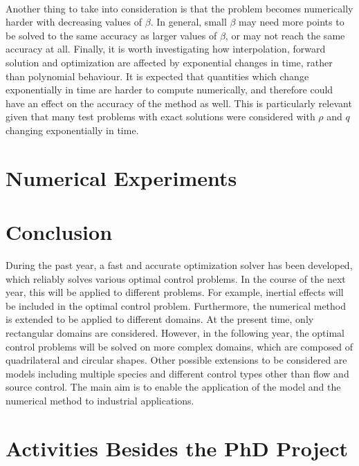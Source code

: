 \documentclass[11pt, a4paper]{article}
\theoremstyle{definition}
\newcommand{\adj}{q}
\begin{document}
\\
Another thing to take into consideration is that the problem becomes numerically harder with decreasing values of $\beta$. In general, small $\beta$ may need more points to be solved to the same accuracy as larger values of $\beta$, or may not reach the same accuracy at all.  Finally, it is worth investigating how interpolation, forward solution and optimization are affected by exponential changes in time, rather than polynomial behaviour. It is expected that quantities which change exponentially in time are harder to compute numerically, and therefore could have an effect on the accuracy of the method as well. This is particularly relevant given that many test problems with exact solutions were considered with $\rho$ and $\adj$ changing exponentially in time.


\section{Numerical Experiments} \label{sec:Examples}



\section{Conclusion}
During the past year, a fast and accurate optimization solver has been developed, which reliably solves various optimal control problems. In the course of the next year, this will be applied to different problems. For example, inertial effects will be included in the optimal control problem. Furthermore, the numerical method is extended to be applied to different domains. At the present time, only rectangular domains are considered. However, in the following year, the optimal control problems will be solved on more complex domains, which are composed of quadrilateral and circular shapes. 
Other possible extensions to be considered are models including multiple species and different control types other than flow and source control.
The main aim is to enable the application of the model and the numerical method to industrial applications.


\pagebreak	



\pagebreak
\appendix

\section{Activities Besides the PhD Project}
\end{document}
